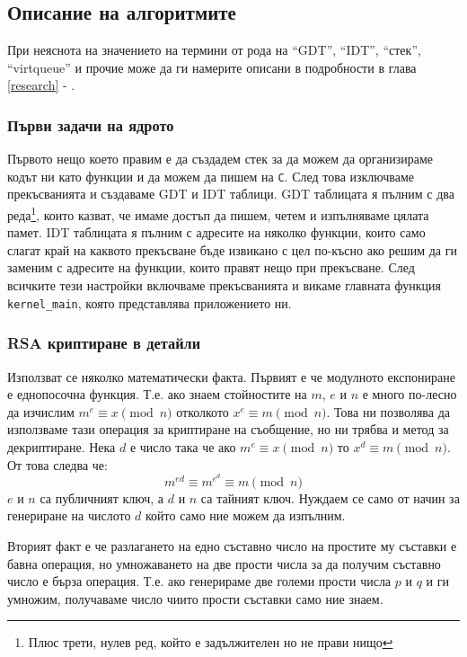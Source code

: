 \subsection{Описание на алгоритмите}
При неяснота на значението на термини от рода на ``GDT'', ``IDT'', ``стек'', ``virtqueue'' и прочие може да ги намерите описани в подробности в глава \ref{research} - .
\subsubsection{Първи задачи на ядрото}
Първото нещо което правим е да създадем стек за да можем да организираме кодът ни като функции и да можем да пишем на {\tt C}. След това изключваме прекъсванията и създаваме GDT и IDT таблици. GDT таблицата я пълним с два реда\footnote{Плюс трети, нулев ред, който е задължителен но не прави нищо}, които казват, че имаме достъп да пишем, четем и изпълняваме цялата памет. IDT таблицата я пълним с адресите на няколко функции, които само слагат край на каквото прекъсване бъде извикано с цел по-късно ако решим да ги заменим с адресите на функции, които правят нещо при прекъсване. След всичките тези настройки включваме прекъсванията и викаме главната функция {\tt kernel\_main}, която представлява приложението ни.

\subsubsection{RSA криптиране в детайли} \label{rsaalgo}
Използват се няколко математически факта. Първият е че модулното експониране е еднопосочна функция. Т.е. ако знаем стойностите на $m$, $e$ и $n$ е много по-лесно да изчислим $m^e \equiv x \pmod n$ отколкото $x^e \equiv m \pmod n$. Това ни позволява да използваме тази операция за криптиране на съобщение, но ни трябва и метод за декриптиране. Нека $d$ е число така че ако $m^e \equiv x \pmod n$ то $x^d \equiv m \pmod n$. От това следва че:
$$m^{ed} \equiv m^{e^d} \equiv m \pmod n$$
$e$ и $n$ са публичният ключ, а $d$ и $n$ са тайният ключ. Нуждаем се само от начин за генериране на числото $d$ който само ние можем да изпълним.

Вторият факт е че разлагането на едно съставно число на простите му съставки е бавна операция, но умножаването на две прости числа за да получим съставно число е бърза операция. Т.е. ако генерираме две големи прости числа $p$ и $q$ и ги умножим, получаваме число чиито прости съставки само ние знаем.

